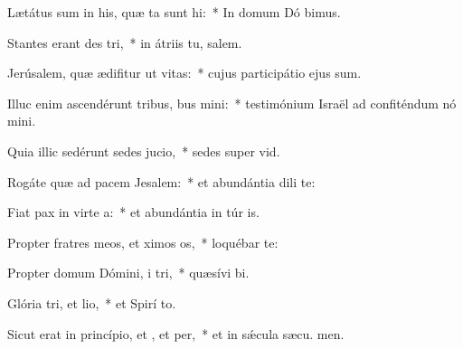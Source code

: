 \item Lætátus sum in his, quæ ta sunt hi:~* In domum Dó bimus.
\item Stantes erant des tri,~* in átriis tu, salem.
\item Jerúsalem, quæ ædifitur ut vitas:~* cujus participátio ejus  sum.
\item Illuc enim ascendérunt tribus, bus mini:~* testimónium Israël ad confiténdum nó mini.
\item Quia illic sedérunt sedes  jucio,~* sedes super  vid.
\item Rogáte quæ ad pacem  Jesalem:~* et abundántia dili te:
\item Fiat pax in virte a:~* et abundántia in túr is.
\item Propter fratres meos, et ximos os,~* loquébar   te:
\item Propter domum Dómini, i tri,~* quæsívi  bi.
\item Glória tri, et lio,~* et Spirí to.
\item Sicut erat in princípio, et , et per,~* et in sǽcula sæcu. men.
